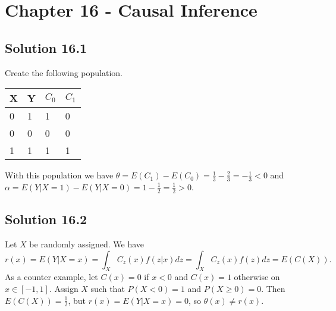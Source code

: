 \section*{Chapter 16 - Causal Inference}

\subsection*{Solution 16.1}

Create the following population.

\begin{table}[H]
\begin{tabular}{l|l||l|l}
X & Y & $C_0$ & $C_1$ \\ \hline \hline
0 & 1 & 1    & 0    \\ \hline
0 & 0 & 0    & 0    \\ \hline
1 & 1 & 1    & 1
\end{tabular}
\end{table}
With this population we have $\theta = E(C_1) - E(C_0) = \frac{1}{3} - \frac{2}{3} = -\frac{1}{3} < 0$ and $\alpha = E(Y|X=1) - E(Y|X=0) = 1 - \frac{1}{2} = \frac{1}{2} > 0$.


\subsection*{Solution 16.2}

Let $X$ be randomly assigned.
We have
\begin{equation*}
    r(x) = E(Y|X = x)
        = \int_{X} C_{z}(x) f(z|x) dz
        = \int_{X} C_{z}(x) f(z) dz
        = E(C(X)).
\end{equation*}
As a counter example, let $C(x) = 0$ if $x < 0$ and $C(x) = 1$ otherwise on $x \in [-1, 1]$.
Assign $X$ such that $P(X < 0) = 1$ and $P(X \geq 0) = 0$.
Then $E(C(X)) = \frac{1}{2}$, but $r(x) = E(Y|X = x) = 0$, so $\theta(x) \neq r(x)$.
